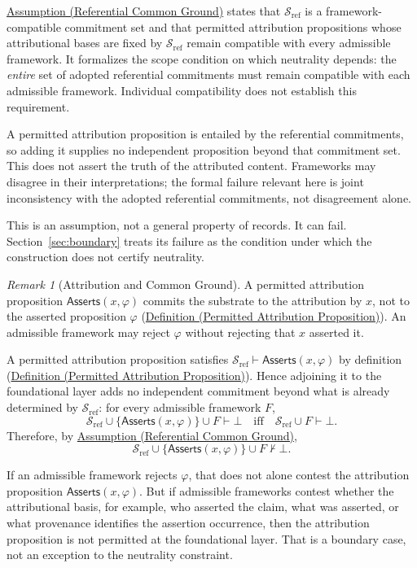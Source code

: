 \documentclass[11pt]{article}
\theoremstyle{plain}
\theoremstyle{definition}
\theoremstyle{remark}
\newtheorem{remark}[theorem]{Remark}
\newcommand{\DefRef}[2]{\hyperref[#1]{Definition (#2)}}
\newcommand{\AssumpRef}[2]{\hyperref[#1]{Assumption (#2)}}
\newcommand{\SecRef}[1]{Section~\ref{#1}}
\newcommand{\SubstrateRef}{\mathcal{S}_{\mathrm{ref}}}
\newcommand{\Framework}{F}
\newcommand{\entails}{\vdash}
\newcommand{\notentails}{\nvdash}
\newcommand{\Asserts}{\mathsf{Asserts}}
\begin{document}
\AssumpRef{se100.assump.ReferentialCommonGround}{Referential Common Ground}
states that $\SubstrateRef$ is a framework-compatible commitment set and
that permitted attribution propositions whose attributional bases are fixed
by $\SubstrateRef$ remain compatible with every admissible framework.
It formalizes the scope condition on which neutrality depends:
the \emph{entire} set of adopted referential commitments must remain
compatible with each admissible framework.
Individual compatibility does not establish this requirement.

A permitted attribution proposition is entailed by the referential
commitments, so adding it supplies no independent proposition beyond
that commitment set.
This does not assert the truth of the attributed content.
Frameworks may disagree in their interpretations; the formal
failure relevant here is joint inconsistency with the adopted
referential commitments, not disagreement alone.

This is an assumption, not a general property of records.
It can fail.
\SecRef{sec:boundary} treats its failure as the condition under which
the construction does not certify neutrality.

\begin{remark}[Attribution and Common Ground]
  \label{se100.remark.AttributionCommonGround}
  A permitted attribution proposition
  $\Asserts(x,\varphi)$ commits the substrate to the attribution by $x$,
  not to the asserted proposition $\varphi$
  (\DefRef{se100.def.PermittedAttributionProposition}{Permitted Attribution Proposition}).
  An admissible framework may reject $\varphi$ without rejecting that
  $x$ asserted it.

  A permitted attribution proposition satisfies
  $\SubstrateRef \entails \Asserts(x,\varphi)$
  by definition
  (\DefRef{se100.def.PermittedAttributionProposition}{Permitted Attribution Proposition}).
  Hence adjoining it to the foundational layer adds no independent commitment
  beyond what is already determined by $\SubstrateRef$: for every admissible
  framework $\Framework$,
  \[
    \SubstrateRef \cup \{\Asserts(x,\varphi)\} \cup \Framework
    \entails \bot
    \quad\text{iff}\quad
    \SubstrateRef \cup \Framework \entails \bot .
  \]
  Therefore, by
  \AssumpRef{se100.assump.ReferentialCommonGround}{Referential Common Ground},
  \[
    \SubstrateRef \cup \{\Asserts(x,\varphi)\} \cup \Framework
    \notentails \bot .
  \]

  If an admissible framework rejects $\varphi$,
  that does not alone contest the attribution proposition $\Asserts(x,\varphi)$.
  But if admissible frameworks contest whether the attributional basis,
  for example, who asserted the claim, what was
  asserted, or what provenance identifies the assertion occurrence,
  then the attribution proposition is not permitted at the foundational layer.
  That is a boundary case, not an exception to the neutrality constraint.
\end{remark}
\end{document}
